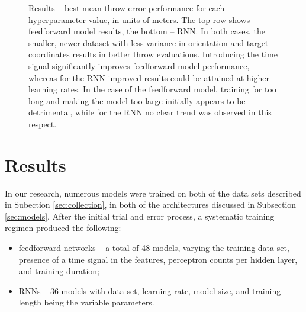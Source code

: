 \documentclass{article}
\begin{document}
\begin{figure}[!hbt]
	\centering
	\caption{Results -- best mean throw error performance for each hyperparameter value, in units of meters. The top row shows feedforward model results, the bottom -- RNN. In both cases, the smaller, newer dataset with less variance in orientation and target coordinates results in better throw evaluations.  Introducing the time signal significantly improves feedforward model performance, whereas for the RNN improved results could be attained at higher learning rates. In the case of the feedforward model, training for too long and making the model too large initially appears to be detrimental, while for the RNN no clear trend was observed in this respect.}
	\label{fig:rnn_naive_best}
\end{figure}

\section{Results}
\label{sec:results}

In our research, numerous models were trained on both of the data sets described in Subection \ref{sec:collection}, in both of the architectures discussed in Subsection \ref{sec:models}. After the initial trial and error process, a systematic training regimen produced the following:

\begin{itemize}
	\item feedforward networks -- a total of 48 models, varying the training data set, presence of a time signal in the features, perceptron counts per hidden layer, and training duration;
	\item RNNs -- 36 models with data set, learning rate, model size, and training length being the variable parameters.
\end{itemize}
\end{document}
